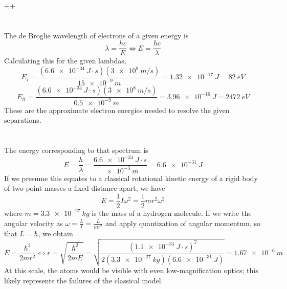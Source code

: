 ++\documentclass{article}
\begin{document}
\section{}
The de Broglie wavelength of electrons of a given energy is
\[\lambda=\frac{hc}{E}\Leftrightarrow E=\frac{hc}{\lambda}\]
Calculating this for the given lambdas,
\[E_i=\frac{(\SI{6.6e-34}{J\cdot s})(\SI{3e8}{m/s})}{\SI{15e-9}{m}}=\SI{1.32e-17}{J}=\SI{82}{eV}\]
\[E_{ii}=\frac{(\SI{6.6e-34}{J\cdot s})(\SI{3e8}{m/s})}{\SI{0.5e-9}{m}}=\SI{3.96e-16}{J}=\SI{2472}{eV}\]
These are the approximate electron energies needed to resolve the given separations.
\section{}
The energy corresponding to that spectrum is
\[E=\frac{h}{\lambda}=\frac{\SI{6.6e-34}{J\cdot s}}{\SI{e-3}{m}}=\SI{6.6e-31}{J}\]
If we presume this equates to a classical rotational kinetic energy of a rigid body of two point masses a fixed distance apart, we have
\[E=\frac{1}{2}I\omega^2=\frac{1}{2}mr^2\omega^2\]
where $m=\SI{3.3e-27}{kg}$ is the mass of a hydrogen molecule. If we write the angular velocity as $\omega=\frac{L}{I}=\frac{L}{mr^2}$ and apply quantization of angular momentum, so that $L=\hbar$, we obtain
\[E=\frac{\hbar^2}{2mr^2}\Leftrightarrow r=\sqrt{\frac{\hbar^2}{2mE}}=\sqrt{\frac{(\SI{1.1e-34}{J\cdot s})^2}{2(\SI{3.3e-27}{kg})(\SI{6.6e-31}{J})}}=\SI{1.67e-6}{m}\]
At this scale, the atoms would be visible with even low-magnification optics; this likely represents the failures of the classical model.
\end{document}
